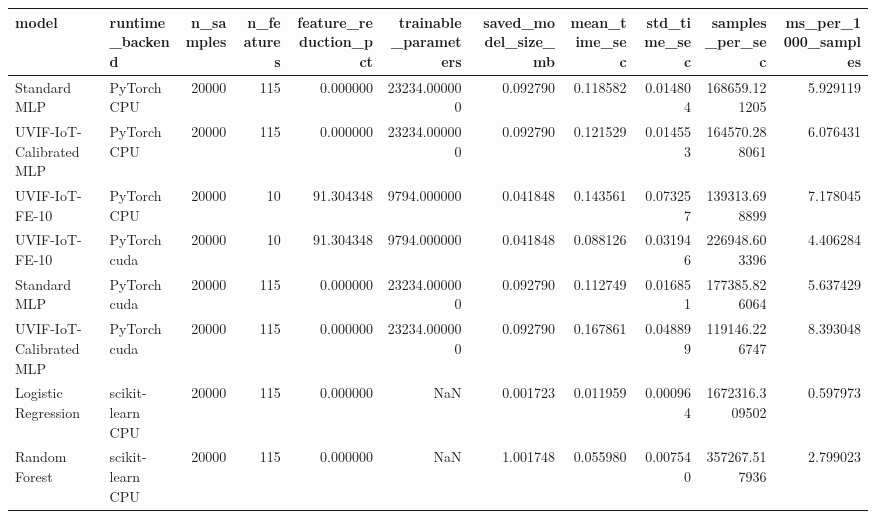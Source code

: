 \begin{tabular}{llrrrrrrrrr}
\toprule
model & runtime\_backend & n\_samples & n\_features & feature\_reduction\_pct & trainable\_parameters & saved\_model\_size\_mb & mean\_time\_sec & std\_time\_sec & samples\_per\_sec & ms\_per\_1000\_samples \\
\midrule
Standard MLP & PyTorch CPU & 20000 & 115 & 0.000000 & 23234.000000 & 0.092790 & 0.118582 & 0.014804 & 168659.121205 & 5.929119 \\
UVIF-IoT-Calibrated MLP & PyTorch CPU & 20000 & 115 & 0.000000 & 23234.000000 & 0.092790 & 0.121529 & 0.014553 & 164570.288061 & 6.076431 \\
UVIF-IoT-FE-10 & PyTorch CPU & 20000 & 10 & 91.304348 & 9794.000000 & 0.041848 & 0.143561 & 0.073257 & 139313.698899 & 7.178045 \\
UVIF-IoT-FE-10 & PyTorch cuda & 20000 & 10 & 91.304348 & 9794.000000 & 0.041848 & 0.088126 & 0.031946 & 226948.603396 & 4.406284 \\
Standard MLP & PyTorch cuda & 20000 & 115 & 0.000000 & 23234.000000 & 0.092790 & 0.112749 & 0.016851 & 177385.826064 & 5.637429 \\
UVIF-IoT-Calibrated MLP & PyTorch cuda & 20000 & 115 & 0.000000 & 23234.000000 & 0.092790 & 0.167861 & 0.048899 & 119146.226747 & 8.393048 \\
Logistic Regression & scikit-learn CPU & 20000 & 115 & 0.000000 & NaN & 0.001723 & 0.011959 & 0.000964 & 1672316.309502 & 0.597973 \\
Random Forest & scikit-learn CPU & 20000 & 115 & 0.000000 & NaN & 1.001748 & 0.055980 & 0.007540 & 357267.517936 & 2.799023 \\
\bottomrule
\end{tabular}
